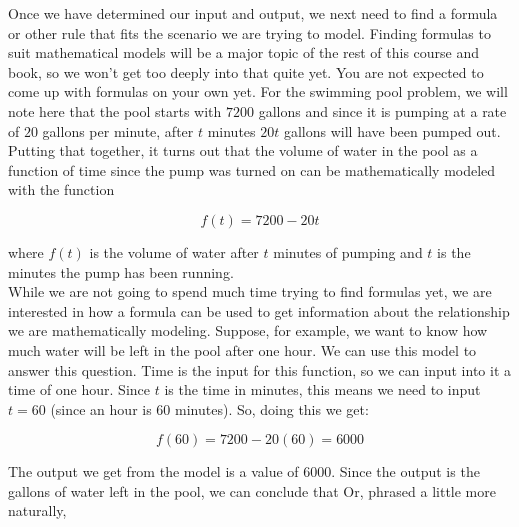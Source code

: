 Once we have determined our input and output, we next need to find a formula or other rule that fits the scenario we are trying to model. Finding formulas to suit mathematical models will be a major topic of the rest of this course and book, so we won’t get too deeply into that quite yet. You are not expected to come up with formulas on your own yet. For the swimming pool problem, we will note here that the pool starts with $7200$ gallons and since it is pumping at a rate of $20$ gallons per minute, after $t$ minutes $20t$ gallons will have been pumped out. Putting that together, it turns out that the volume of water in the pool as a function of time since the pump was turned on can be mathematically modeled with the function

\begin{equation*}
	f(t)=7200-20t
\end{equation*}

where $f(t)$ is the volume of water after $t$ minutes of pumping and $t$ is the minutes the pump has been running.\\

While we are not going to spend much time trying to find formulas yet, we are interested in how a formula can be used to get information about the relationship we are mathematically modeling.  Suppose, for example, we want to know how much water will be left in the pool after one hour. We can use this model to answer this question. Time is the input for this function, so we can input into it a time of one hour. Since $t$ is the time in minutes, this means we need to input $t=60$ (since an hour is $60$ minutes). So, doing this we get:

\begin{equation*}
	f(60)=7200-20(60)=6000
\end{equation*}

The output we get from the model is a value of $6000$. Since the output is the gallons of water left in the pool, we can conclude that   Or, phrased a little more naturally, 


